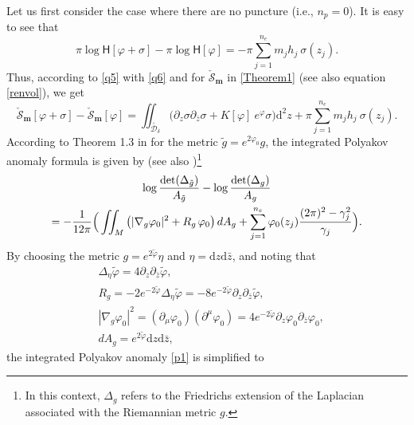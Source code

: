 \documentclass[a4paper,11pt]{article}
\newcommand{\dd}{\mathrm{d}}
\newcommand{\singfund}{\overset{{}_{\curlywedge}}{\mathcal{D}}}
\begin{document}
Let us first consider the case where there are no puncture (i.e., $n_p=0$).  It is easy to see that
\begin{equation}
\pi \log \mathsf{H}[\varphi+\sigma]-\pi \log \mathsf{H}[\varphi] = -\pi \sum_{j=1}^{n_e} m_j h_j~ \sigma(z_j).\label{q6}
\end{equation}
Thus, according to \eqref{q5} with \eqref{q6} and for $\check{\mathscr{S}}_{\boldsymbol{m}}$ in \eqref{Theorem1} (see also equation \eqref{renvol}), we get
\begin{equation}
\check{\mathscr{S}}_{\boldsymbol{m}}[\varphi+\sigma]-\check{\mathscr{S}}_{\boldsymbol{m}}[\varphi] = \iint_{\singfund_{\delta}}\Big(\partial_z \sigma\partial_{\bar{z}}\sigma +  K[\varphi] ~e^{\varphi} \sigma\Big) \dd^{2}z +\pi \sum_{j=1}^{n_e} m_j h_j~ \sigma(z_j).\label{q7}
\end{equation}
According to Theorem 1.3 in \cite{aldana2020polyakov} for the metric $\tilde{g}= e^{2\varphi_{0}}g$, the integrated Polyakov anomaly formula is given by (see also \cite{kalvin2021polyakov})\footnote{In this context, $\Delta_{g}$ refers to the Friedrichs extension of the Laplacian associated with the Riemannian metric $g$.}
\begin{multline}
\log\frac{\text{det}(\Delta_{\tilde{g}})}{A_{\tilde{g}}}- \log\frac{\text{det}(\Delta_{g})}{A_{g}}\\
=-\frac{1}{12\pi}\Big(\iint_{M}\left(|\nabla_{g}\varphi_0|^2 +  R_{g}\hspace{.5mm}\varphi_0\right) dA_g+ \sum_{j=1}^{n_
e}\varphi_0(z_j)\frac{(2\pi)^2-\gamma_{j}^2}{\gamma_j}\Big).\label{p1}
\end{multline}
By choosing the metric $g= e^{2\tilde{\varphi}}\eta$ and $\eta= \dd z \dd{\bar{z}}$, and noting that
\begin{equation}
\begin{split}
&\Delta_{\eta}\tilde{\varphi} = 4\partial_{z}\partial_{\bar{z}}\tilde{\varphi},\\&
R_{g} = -2e^{-2\tilde{\varphi}}\Delta_{\eta}\tilde{\varphi} = -8e^{-2\tilde{\varphi}}\partial_{z}\partial_{\bar{z}}\tilde{\varphi},\\&
|\nabla_{g}\varphi_0|^2 = (\partial_{\mu}\varphi_0)(\partial^{\mu}\varphi_0) =  4 e^{-2\tilde{\varphi}}\partial_{z}\varphi_0\partial_{\bar{z}}\varphi_0,\\&
dA_g = e^{2\tilde{\varphi}}\dd z\dd\bar{z},
\end{split}
\end{equation}
the integrated Polyakov anomaly \eqref{p1} is simplified to
\end{document}
